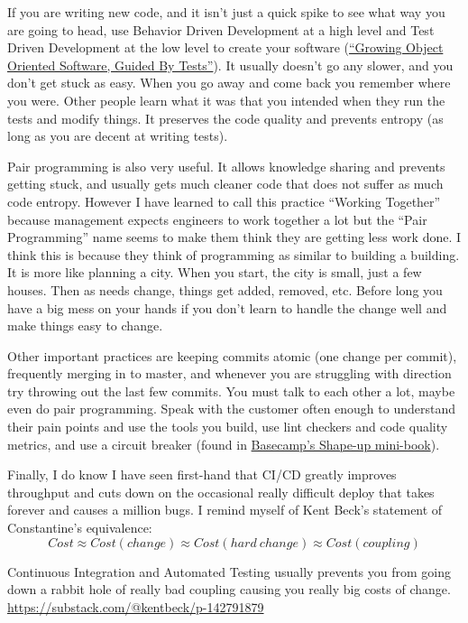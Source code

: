 \documentclass[letter,12pt]{article}
\begin{document}
If you are writing new code, and it isn't just a quick spike to see what way you are going to head, use Behavior Driven Development at a high level and Test Driven Development at the low level to create your software (\href{http://www.growing-object-oriented-software.com/}{``Growing Object Oriented Software, Guided By Tests''}). It usually doesn't go any slower, and you don't get stuck as easy. When you go away and come back you remember where you were. Other people learn what it was that you intended when they run the tests and modify things. It preserves the code quality and prevents entropy (as long as you are decent at writing tests).

Pair programming is also very useful. It allows knowledge sharing and prevents getting stuck, and usually gets much cleaner code that does not suffer as much code entropy. However I have learned to call this practice ``Working Together'' because management expects engineers to work together a lot but the ``Pair Programming'' name seems to make them think they are getting less work done. I think this is because they think of programming as similar to building a building. It is more like planning a city. When you start, the city is small, just a few houses. Then as needs change, things get added, removed, etc. Before long you have a big mess on your hands if you don't learn to handle the change well and make things easy to change.


Other important practices are keeping commits atomic (one change per commit), frequently merging in to master, and whenever you are struggling with direction try throwing out the last few commits. You must talk to each other a lot, maybe even do pair programming. Speak with the customer often enough to understand their pain points and use the tools you build, use lint checkers and code quality metrics, and use a circuit breaker (found in \href{https://basecamp.com/shapeup/2.2-chapter-08#the-circuit-breaker}{Basecamp's Shape-up mini-book}).

Finally, I do know I have seen first-hand that CI/CD greatly improves throughput and cuts down on the occasional really difficult deploy that takes forever and causes a million bugs. I remind myself of Kent Beck's statement of Constantine's equivalence:
\begin{equation}
  Cost \approx Cost(change) \approx Cost(hard\ change) \approx Cost(coupling)
\end{equation}

Continuous Integration and Automated Testing usually prevents you from going down a rabbit hole of really bad coupling causing you really big costs of change. \href{https://substack.com/@kentbeck/p-142791879}{https://substack.com/@kentbeck/p-142791879}
\end{document}
